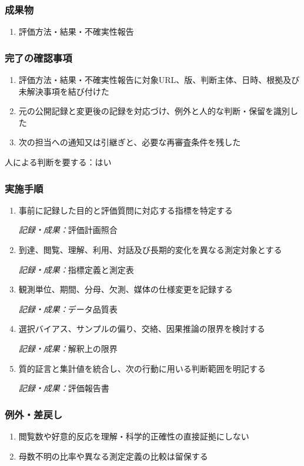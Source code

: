 \documentclass[a4paper,11pt]{article}
\begin{document}
\subsubsection*{成果物}
\begin{enumerate}[leftmargin=2em,itemsep=0.35em]
\item 評価方法・結果・不確実性報告
\end{enumerate}
\subsubsection*{完了の確認事項}
\begin{enumerate}[leftmargin=2em,itemsep=0.35em]
\item 評価方法・結果・不確実性報告に対象URL、版、判断主体、日時、根拠及び未解決事項を結び付けた
\item 元の公開記録と変更後の記録を対応づけ、例外と人的な判断・保留を識別した
\item 次の担当への通知又は引継ぎと、必要な再審査条件を残した
\end{enumerate}
\par 人による判断を要する：はい\par\medskip
\subsubsection*{実施手順}
\begin{enumerate}[leftmargin=2em,itemsep=0.65em]
\item 事前に記録した目的と評価質問に対応する指標を特定する\par\noindent\textit{記録・成果：}評価計画照合\nobreak\smallskip
\item 到達、閲覧、理解、利用、対話及び長期的変化を異なる測定対象とする\par\noindent\textit{記録・成果：}指標定義と測定表\nobreak\smallskip
\item 観測単位、期間、分母、欠測、媒体の仕様変更を記録する\par\noindent\textit{記録・成果：}データ品質表\nobreak\smallskip
\item 選択バイアス、サンプルの偏り、交絡、因果推論の限界を検討する\par\noindent\textit{記録・成果：}解釈上の限界\nobreak\smallskip
\item 質的証言と集計値を統合し、次の行動に用いる判断範囲を明記する\par\noindent\textit{記録・成果：}評価報告書\nobreak\smallskip
\end{enumerate}
\subsubsection*{例外・差戻し}
\begin{enumerate}[leftmargin=2em,itemsep=0.35em]
\item 閲覧数や好意的反応を理解・科学的正確性の直接証拠にしない
\item 母数不明の比率や異なる測定定義の比較は留保する
\end{enumerate}
\end{document}
